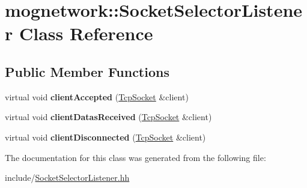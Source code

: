 \hypertarget{classmognetwork_1_1_socket_selector_listener}{\section{mognetwork\-:\-:Socket\-Selector\-Listener Class Reference}
\label{classmognetwork_1_1_socket_selector_listener}
}
\subsection*{Public Member Functions}
\begin{DoxyCompactItemize}
\item 
\hypertarget{classmognetwork_1_1_socket_selector_listener_a5940a832d52941961c2361d950c9bfc1}{virtual void {\bfseries client\-Accepted} (\hyperlink{classmognetwork_1_1_tcp_socket}{Tcp\-Socket} \&client)}\label{classmognetwork_1_1_socket_selector_listener_a5940a832d52941961c2361d950c9bfc1}

\item 
\hypertarget{classmognetwork_1_1_socket_selector_listener_a9219c1c75802958e552fb2b96636200b}{virtual void {\bfseries client\-Datas\-Received} (\hyperlink{classmognetwork_1_1_tcp_socket}{Tcp\-Socket} \&client)}\label{classmognetwork_1_1_socket_selector_listener_a9219c1c75802958e552fb2b96636200b}

\item 
\hypertarget{classmognetwork_1_1_socket_selector_listener_a094cfb5ddd27825e98ebecc10990218d}{virtual void {\bfseries client\-Disconnected} (\hyperlink{classmognetwork_1_1_tcp_socket}{Tcp\-Socket} \&client)}\label{classmognetwork_1_1_socket_selector_listener_a094cfb5ddd27825e98ebecc10990218d}

\end{DoxyCompactItemize}


The documentation for this class was generated from the following file\-:\begin{DoxyCompactItemize}
\item 
include/\hyperlink{_socket_selector_listener_8hh}{Socket\-Selector\-Listener.\-hh}\end{DoxyCompactItemize}
